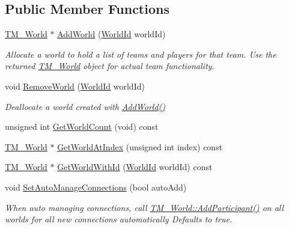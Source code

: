 \subsection*{Public Member Functions}
\begin{DoxyCompactItemize}
\item 
\hyperlink{class_rak_net_1_1_t_m___world}{T\-M\-\_\-\-World} $\ast$ \hyperlink{class_rak_net_1_1_team_manager_a329c459c522b5e3204424499fe4f8bd7}{Add\-World} (\hyperlink{group___r_e_p_l_i_c_a___m_a_n_a_g_e_r___g_r_o_u_p3_ga44b59af8e882248f61aa41d8ace38bf7}{World\-Id} world\-Id)
\begin{DoxyCompactList}\small\item\em Allocate a world to hold a list of teams and players for that team. Use the returned \hyperlink{class_rak_net_1_1_t_m___world}{T\-M\-\_\-\-World} object for actual team functionality. \end{DoxyCompactList}\item 
void \hyperlink{class_rak_net_1_1_team_manager_a5cfcd5a350a1b1d7ea1460d45ec87678}{Remove\-World} (\hyperlink{group___r_e_p_l_i_c_a___m_a_n_a_g_e_r___g_r_o_u_p3_ga44b59af8e882248f61aa41d8ace38bf7}{World\-Id} world\-Id)
\begin{DoxyCompactList}\small\item\em Deallocate a world created with \hyperlink{class_rak_net_1_1_team_manager_a329c459c522b5e3204424499fe4f8bd7}{Add\-World()} \end{DoxyCompactList}\item 
unsigned int \hyperlink{class_rak_net_1_1_team_manager_ac2b9fc40570ad1342f4a330141a18d12}{Get\-World\-Count} (void) const 
\item 
\hyperlink{class_rak_net_1_1_t_m___world}{T\-M\-\_\-\-World} $\ast$ \hyperlink{class_rak_net_1_1_team_manager_a2dae07e3f4360801e1eae592e81a9f9d}{Get\-World\-At\-Index} (unsigned int index) const 
\item 
\hyperlink{class_rak_net_1_1_t_m___world}{T\-M\-\_\-\-World} $\ast$ \hyperlink{class_rak_net_1_1_team_manager_a6bf583d8eac750b9910d983852e1a0b1}{Get\-World\-With\-Id} (\hyperlink{group___r_e_p_l_i_c_a___m_a_n_a_g_e_r___g_r_o_u_p3_ga44b59af8e882248f61aa41d8ace38bf7}{World\-Id} world\-Id) const 
\item 
void \hyperlink{class_rak_net_1_1_team_manager_a4646991e21f478677fa0eda9fa0f91ad}{Set\-Auto\-Manage\-Connections} (bool auto\-Add)
\begin{DoxyCompactList}\small\item\em When auto managing connections, call \hyperlink{class_rak_net_1_1_t_m___world_a75531795fd1adc74d7edae660c4ecc17}{T\-M\-\_\-\-World\-::\-Add\-Participant()} on all worlds for all new connections automatically Defaults to true. \end{DoxyCompactList}\item 

\end{DoxyCompactItemize}
